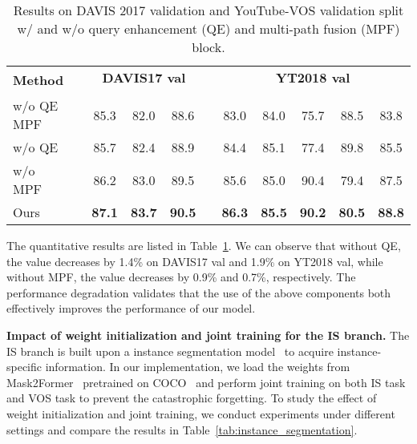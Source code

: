 \documentclass[10pt,twocolumn,letterpaper]{article}
\begin{document}
\begin{table}[!ht]
\centering
  \setlength{\tabcolsep}{0pt}
  \begin{tabular*}{\linewidth}{@{\extracolsep{\fill}}lc | cccc | ccccc @{}}
    \toprule
    \multirow{2}{0.6in}{\textbf{Method}} && \multicolumn{3}{c}{\textbf{DAVIS17 val}} && \multicolumn{5}{c}{\textbf{YT2018 val}}  \\
    ~ &&  &  &  &&   &  &  &  &  \\
    \midrule
    w/o QE  MPF && 85.3 & 82.0 & 88.6 && 83.0 & 84.0 & 75.7 & 88.5 & 83.8 \\
    w/o QE && 85.7	& 82.4 & 88.9 && 84.4 & 85.1 & 77.4 & 89.8 & 85.5 \\
    w/o MPF && 86.2 & 83.0 & 89.5 && 85.6 & 85.0 & 90.4 & 79.4 & 87.5 \\
    Ours && \textbf{87.1} & \textbf{83.7} & \textbf{90.5} && \textbf{86.3} & \textbf{85.5} & \textbf{90.2} & \textbf{80.5} & \textbf{88.8} \\
    \bottomrule
  \end{tabular*}
  \vspace{-0.1in}
 \caption{Results on DAVIS 2017 validation and YouTube-VOS validation split w/ and w/o query enhancement (QE) and multi-path fusion (MPF) block. }
\label{tab:components}
\end{table}

The quantitative results are listed in Table~\ref{tab:components}. We can observe that without QE, the  value decreases by 1.4\% on DAVIS17 val and 1.9\% on YT2018 val, while without MPF, the  value decreases by 0.9\% and 0.7\%, respectively. The performance degradation validates that the use of the above components both effectively improves the performance of our model.

\vspace{0.02in}
\noindent \textbf{Impact of weight initialization and joint training for the IS branch.} The IS branch is built upon a instance segmentation model~\cite{cheng2022masked} to acquire instance-specific information. In our implementation, we load the weights from Mask2Former~\cite{cheng2022masked} pretrained on COCO~\cite{lin2014microsoft} and perform joint training on both IS task and VOS task to prevent the catastrophic forgetting. To study the effect of weight initialization and joint training, we conduct experiments under different settings and compare the results in Table~\ref{tab:instance_segmentation}.
\end{document}
